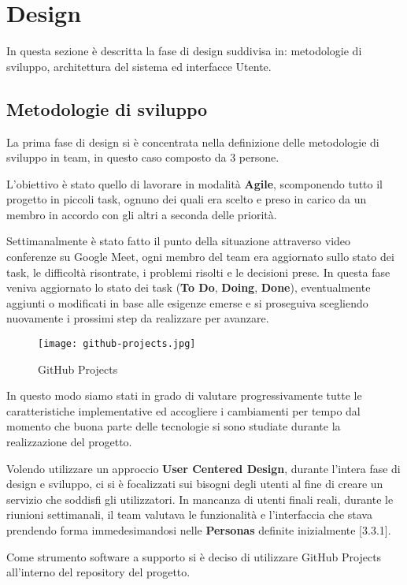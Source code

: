 \section{Design}
In questa sezione è descritta la fase di design suddivisa in: metodologie di sviluppo, architettura del sistema ed interfacce Utente.

\subsection{Metodologie di sviluppo}
La prima fase di design si è concentrata nella definizione delle metodologie di sviluppo in team, in questo caso composto da 3 persone.

L'obiettivo è stato quello di lavorare in modalità \textbf{Agile}, scomponendo tutto il progetto in piccoli task, 
ognuno dei quali era scelto e preso in carico da un membro in accordo con gli altri a seconda delle priorità.

Settimanalmente è stato fatto il punto della situazione attraverso video conferenze su Google Meet, 
ogni membro del team era aggiornato sullo stato dei task, le difficoltà risontrate, i problemi risolti e le decisioni prese.
In questa fase veniva aggiornato lo stato dei task (\textbf{To Do}, \textbf{Doing}, \textbf{Done}), 
eventualmente aggiunti o modificati in base alle esigenze emerse
e si proseguiva scegliendo nuovamente i prossimi step da realizzare per avanzare.

\begin{figure}[H]
	\centering
	\texttt{[image: github-projects.jpg]}
	\caption{GitHub Projects}
	\label{fig:github-projects}
\end{figure}

In questo modo siamo stati in grado di valutare progressivamente tutte le caratteristiche implementative ed accogliere i cambiamenti per tempo
dal momento che buona parte delle tecnologie si sono studiate durante la realizzazione del progetto.

Volendo utilizzare un approccio \textbf{User Centered Design}, durante l'intera fase di design e sviluppo,
ci si è focalizzati sui bisogni degli utenti al fine di creare un servizio che soddisfi gli utilizzatori.
In mancanza di utenti finali reali, durante le riunioni settimanali, 
il team valutava le funzionalità e l'interfaccia che stava prendendo forma immedesimandosi nelle \textbf{Personas} definite inizialmente [3.3.1].

Come strumento software a supporto si è deciso di utilizzare GitHub Projects all'interno del repository del progetto.

